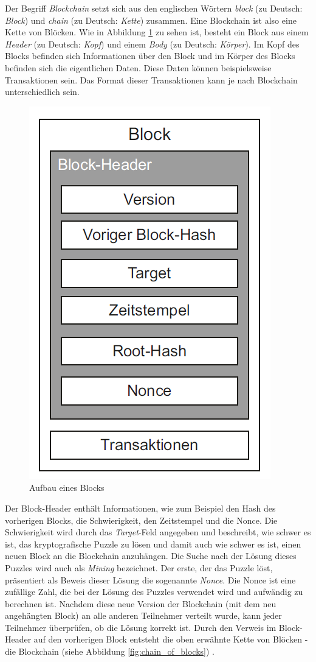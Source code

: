 Der Begriff \textit{Blockchain} setzt sich aus den englischen Wörtern \textit{block} (zu Deutsch: \textit{Block}) und \textit{chain} (zu Deutsch: \textit{Kette}) zusammen. Eine Blockchain ist also eine Kette von Blöcken. Wie in Abbildung \ref{fig:block} zu sehen ist, besteht ein Block aus einem \textit{Header} (zu Deutsch: \textit{Kopf}) und einem \textit{Body} (zu Deutsch: \textit{Körper}). Im Kopf des Blocks befinden sich Informationen über den Block und im Körper des Blocks befinden sich die eigentlichen Daten. Diese Daten können beispielsweise Transaktionen sein. Das Format dieser Transaktionen kann je nach Blockchain unterschiedlich sein.

\begin{figure}[H]
    \centering
    \includegraphics[width=0.35\linewidth]{images/blockchain_block.png}
    \caption{Aufbau eines Blocks \parencite[S. 11]{Fill_BlockchainGrundlagen}}
    \label{fig:block}
\end{figure}


\noindent Der Block-Header enthält Informationen, wie zum Beispiel den Hash des vorherigen Blocks, die Schwierigkeit, den Zeitstempel und die Nonce. Die Schwierigkeit wird durch das \textit{Target}-Feld angegeben und beschreibt, wie schwer es ist, das kryptografische Puzzle zu lösen und damit auch wie schwer es ist, einen neuen Block an die Blockchain anzuhängen. Die Suche nach der Lösung dieses Puzzles wird auch als \textit{Mining} bezeichnet. Der erste, der das Puzzle löst, präsentiert als Beweis dieser Lösung die sogenannte \textit{Nonce}. Die Nonce ist eine zufällige Zahl, die bei der Lösung des Puzzles verwendet wird und aufwändig zu berechnen ist. Nachdem diese neue Version der Blockchain (mit dem neu angehängten Block) an alle anderen Teilnehmer verteilt wurde, kann jeder Teilnehmer überprüfen, ob die Lösung korrekt ist. Durch den Verweis im Block-Header auf den vorherigen Block entsteht die oben erwähnte Kette von Blöcken - die Blockchain (siehe Abbildung \ref{fig:chain_of_blocks}) \parencite[S. 10-12]{Fill_BlockchainGrundlagen}.

